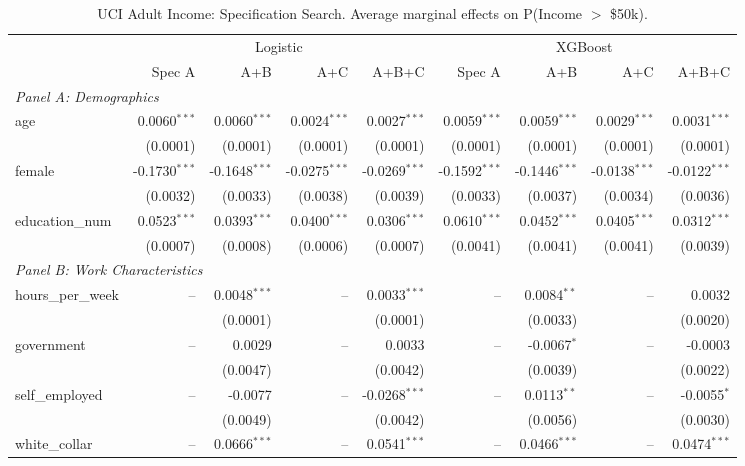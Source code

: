 \begin{table}[htbp]
\centering
\small
\begin{threeparttable}
\caption{UCI Adult Income: Specification Search. Average marginal effects on P(Income $>$ \$50k).}
\label{tab:adult_spec_search}
\begin{tabular}{lrrrrrrrr}
\toprule
 & \multicolumn{4}{c}{Logistic} & \multicolumn{4}{c}{XGBoost} \\
\cmidrule(lr){2-5} \cmidrule(lr){6-9} 
 & Spec A & A+B & A+C & A+B+C & Spec A & A+B & A+C & A+B+C \\
\midrule
\multicolumn{9}{l}{\textit{Panel A: Demographics}} \\
\quad age & 0.0060$^{***}$ & 0.0060$^{***}$ & 0.0024$^{***}$ & 0.0027$^{***}$ & 0.0059$^{***}$ & 0.0059$^{***}$ & 0.0029$^{***}$ & 0.0031$^{***}$ \\
 & (0.0001) & (0.0001) & (0.0001) & (0.0001) & (0.0001) & (0.0001) & (0.0001) & (0.0001) \\
\quad female & -0.1730$^{***}$ & -0.1648$^{***}$ & -0.0275$^{***}$ & -0.0269$^{***}$ & -0.1592$^{***}$ & -0.1446$^{***}$ & -0.0138$^{***}$ & -0.0122$^{***}$ \\
 & (0.0032) & (0.0033) & (0.0038) & (0.0039) & (0.0033) & (0.0037) & (0.0034) & (0.0036) \\
\quad education\_num & 0.0523$^{***}$ & 0.0393$^{***}$ & 0.0400$^{***}$ & 0.0306$^{***}$ & 0.0610$^{***}$ & 0.0452$^{***}$ & 0.0405$^{***}$ & 0.0312$^{***}$ \\
 & (0.0007) & (0.0008) & (0.0006) & (0.0007) & (0.0041) & (0.0041) & (0.0041) & (0.0039) \\
\midrule
\multicolumn{9}{l}{\textit{Panel B: Work Characteristics}} \\
\quad hours\_per\_week & -- & 0.0048$^{***}$ & -- & 0.0033$^{***}$ & -- & 0.0084$^{**}$ & -- & 0.0032 \\
 &  & (0.0001) &  & (0.0001) &  & (0.0033) &  & (0.0020) \\
\quad government & -- & 0.0029 & -- & 0.0033 & -- & -0.0067$^{*}$ & -- & -0.0003 \\
 &  & (0.0047) &  & (0.0042) &  & (0.0039) &  & (0.0022) \\
\quad self\_employed & -- & -0.0077 & -- & -0.0268$^{***}$ & -- & 0.0113$^{**}$ & -- & -0.0055$^{*}$ \\
 &  & (0.0049) &  & (0.0042) &  & (0.0056) &  & (0.0030) \\
\quad white\_collar & -- & 0.0666$^{***}$ & -- & 0.0541$^{***}$ & -- & 0.0466$^{***}$ & -- & 0.0474$^{***}$ \\

\end{tabular}
\end{threeparttable}
\end{table}
